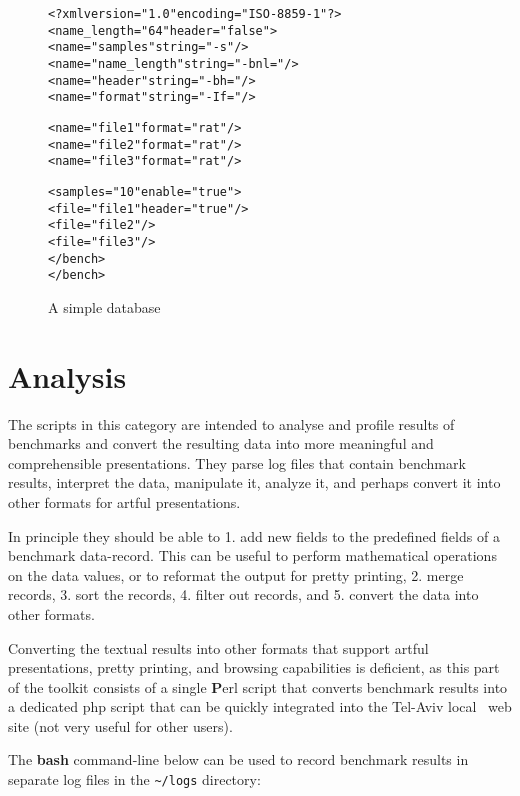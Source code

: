 \begin{figure}[!hbp]
\begin{fminipage}{\textwidth}
\begin{alltt}
<?xml version="1.0" encoding="ISO-8859-1"?>
<\textbf{} name_length="64" header="false">
  <\textbf{} name="samples" string="-s"/>
  <\textbf{} name="name_length" string="-bnl="/> 
  <\textbf{} name="header" string="-bh="/> 
  <\textbf{} name="format" string="-If="/>

  <\textbf{} name="file1" format="rat"/>
  <\textbf{} name="file2" format="rat"/>
  <\textbf{} name="file3" format="rat"/>

  <\textbf{} samples="10" enable="true">
    <\textbf{} file="file1" header="true"/>
    <\textbf{} file="file2"/>
    <\textbf{} file="file3"/>
  </bench>
</bench>  
\end{alltt}
\end{fminipage}
\caption{A simple database}\label{database}
\end{figure}

\section{Analysis\label{Analysis}}
The scripts in this category are intended to analyse and profile
results of benchmarks and convert the resulting data into more
meaningful and comprehensible presentations. They parse log files that
contain benchmark results, interpret the data, manipulate it, analyze
it, and perhaps convert it into other formats for artful presentations.

In principle they should be able to 1. add new fields to the
predefined fields of a benchmark data-record. This can be useful to
perform mathematical operations on the data values, or to reformat the
output for pretty printing, 2. merge records, 3. sort the records, 
4. filter out records, and 5. convert the data into other formats.

Converting the textual results into other formats that support artful
presentations, pretty printing, and browsing capabilities is
deficient, as this part of the toolkit consists of a single
{\textbf Perl} script that converts benchmark results into a dedicated
php script that can be quickly integrated into the Tel-Aviv local
\cgal\ web site (not very useful for other users).

The \textbf{bash} command-line below can be used to record benchmark
results in separate log files in the {\tt \~{}/logs} directory:
 
